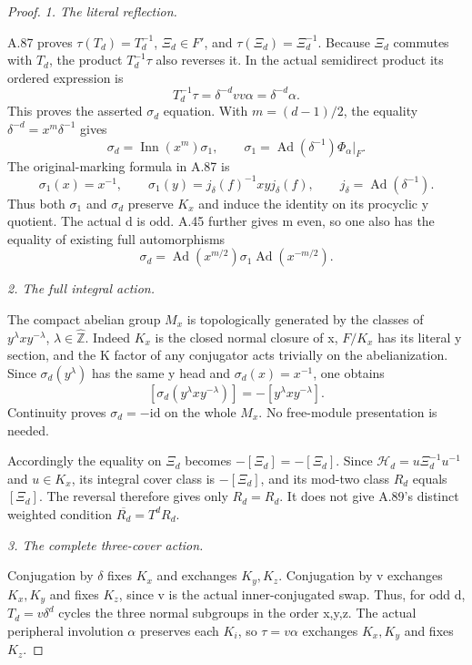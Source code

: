 \begin{proof}
\emph{1. The literal reflection.}\par
A.87 proves \(\tau(T_d)=T_d^{-1}\), \(\Xi_d\in F'\),
and \(\tau(\Xi_d)=\Xi_d^{-1}\).
Because \(\Xi_d\) commutes with \(T_d\), the product
\(T_d^{-1}\tau\) also reverses it. In the actual semidirect
product its ordered expression is
\[
                  T_d^{-1}\tau
                    =\delta^{-d}vv\alpha=\delta^{-d}\alpha.
 \tag{A.91.6}
\]
This proves the asserted \(\sigma_d\) equation.
With \(m=(d-1)/2\), the equality
\(\delta^{-d}=x^m\delta^{-1}\) gives
\[
 \sigma_d=\operatorname{Inn}(x^m)\sigma_1,\qquad
 \sigma_1=\operatorname{Ad}(\delta^{-1})\Phi_\alpha|_F.
 \tag{A.91.7}
\]
The original-marking formula in A.87 is
\[
 \sigma_1(x)=x^{-1},\qquad
 \sigma_1(y)=j_\delta(f)^{-1}xyj_\delta(f),\qquad
 j_\delta=\operatorname{Ad}(\delta^{-1}).
 \tag{A.91.8}
\]
Thus both \(\sigma_1\) and \(\sigma_d\) preserve \(K_x\)
and induce the identity on its procyclic y quotient.
The actual d is odd. A.45 further gives m even, so one
also has the equality of existing full automorphisms
\[
 \sigma_d
   =\operatorname{Ad}(x^{m/2})\sigma_1
        \operatorname{Ad}(x^{-m/2}).
 \tag{A.91.9}
\]

\emph{2. The full integral action.}\par
The compact abelian group \(M_x\) is topologically generated
by the classes of \(y^\lambda x y^{-\lambda}\),
\(\lambda\in\widehat{\mathbb Z}\). Indeed \(K_x\) is the closed
normal closure of x, \(F/K_x\) has its literal y section,
and the K factor of any conjugator acts trivially on the
abelianization. Since \(\sigma_d(y^\lambda)\) has the same
y head and \(\sigma_d(x)=x^{-1}\), one obtains
\[
 [\sigma_d(y^\lambda x y^{-\lambda})]
       =-[y^\lambda x y^{-\lambda}].
 \tag{A.91.10}
\]
Continuity proves \(\sigma_d=-\mathrm{id}\) on the whole
\(M_x\). No free-module presentation is needed.

Accordingly the equality on \(\Xi_d\) becomes
\(-[\Xi_d]=-[\Xi_d]\). Since
\(\mathcal H_d=u\Xi_d^{-1}u^{-1}\) and \(u\in K_x\),
its integral cover class is \(-[\Xi_d]\), and its
mod-two class \(R_d\) equals \([\Xi_d]\).
The reversal therefore gives only \(R_d=R_d\).
It does not give A.89's distinct weighted condition
\(\overline{R_d}=T^dR_d\).

\emph{3. The complete three-cover action.}\par
Conjugation by \(\delta\) fixes \(K_x\) and exchanges
\(K_y,K_z\). Conjugation by v exchanges \(K_x,K_y\)
and fixes \(K_z\), since v is the actual inner-conjugated
swap. Thus, for odd d, \(T_d=v\delta^d\) cycles the
three normal subgroups in the order x,y,z.
The actual peripheral involution \(\alpha\) preserves
each \(K_i\), so \(\tau=v\alpha\) exchanges \(K_x,K_y\)
and fixes \(K_z\).


\end{proof}
